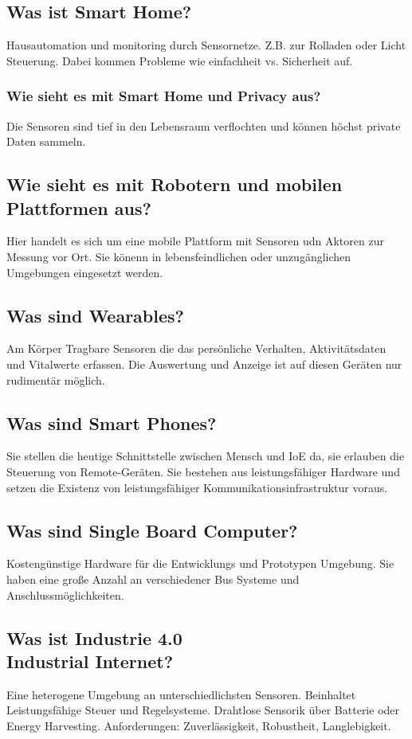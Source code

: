 	\subsection{Was ist Smart Home?}
	Hausautomation und monitoring durch Sensornetze. 
	Z.B. zur Rolladen oder Licht Steuerung.
	Dabei kommen Probleme wie einfachheit vs. Sicherheit auf. 
	\subsubsection{Wie sieht es mit Smart Home und Privacy aus?}
	Die Sensoren sind tief in den Lebensraum verflochten und können höchst private Daten sammeln.
	\subsection{Wie sieht es mit Robotern und mobilen Plattformen aus?}
	Hier handelt es sich um eine mobile Plattform mit Sensoren udn Aktoren zur Messung vor Ort.
	Sie könenn in lebensfeindlichen oder unzugänglichen Umgebungen eingesetzt werden.
	\subsection{Was sind Wearables?}
	Am Körper Tragbare Sensoren die das persönliche Verhalten, Aktivitätsdaten und Vitalwerte erfassen.
	Die Auswertung und Anzeige ist auf diesen Geräten nur rudimentär möglich.
	\subsection{Was sind Smart Phones?}
	Sie stellen die heutige Schnittstelle zwischen Mensch und IoE da, sie erlauben die Steuerung von Remote-Geräten.
	Sie bestehen aus leistungsfähiger Hardware und setzen die Existenz von leistungsfähiger Kommunikationsinfrastruktur voraus.
	\subsection{Was sind Single\- Board Computer?}
	Kostengünstige Hardware für die Entwicklungs und Prototypen Umgebung.
	Sie haben eine große Anzahl an verschiedener Bus Systeme und Anschlussmöglichkeiten.
	
	\subsection{Was ist Industrie 4.0 \\ Industrial Internet?}
	Eine heterogene Umgebung an unterschiedlichsten Sensoren. Beinhaltet Leistungsfähige Steuer\- und Regelsysteme.
	Drahtlose Sensorik über Batterie oder Energy Harvesting.
	Anforderungen: Zuverlässigkeit, Robustheit, Langlebigkeit.
	
